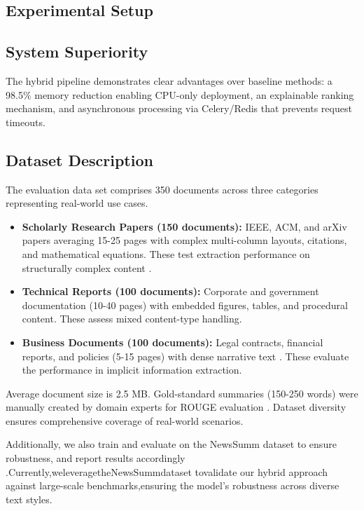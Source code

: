 \documentclass[conference]{IEEEtran}
\begin{document}
\begin{itemize}

\section{Experimental Setup}

\subsection{System Superiority}
The hybrid pipeline demonstrates clear advantages over baseline methods: a 98.5\% memory reduction enabling CPU-only deployment, an explainable ranking mechanism, and asynchronous processing via Celery/Redis that prevents request timeouts.


\subsection{Dataset Description}
The evaluation data set comprises 350 documents across three categories representing real-world use cases.

\begin{itemize}
    \item \textbf{Scholarly Research Papers (150 documents):} IEEE, ACM, and arXiv papers averaging 15-25 pages with complex multi-column layouts, citations, and mathematical equations. These test extraction performance on structurally complex content \cite{10}.
    \item \textbf{Technical Reports (100 documents):} Corporate and government documentation (10-40 pages) with embedded figures, tables, and procedural content. These assess mixed content-type handling.
    \item \textbf{Business Documents (100 documents):} Legal contracts, financial reports, and policies (5-15 pages) with dense narrative text \cite{6}. These evaluate the performance in implicit information extraction.
\end{itemize}

Average document size is 2.5 MB. Gold-standard summaries (150-250 words) were manually created by domain experts for ROUGE evaluation \cite{19}. Dataset diversity ensures comprehensive coverage of real-world scenarios.

Additionally, we also train and evaluate on the NewsSumm dataset to ensure robustness, and report results accordingly \cite{25}.Currently,weleveragetheNewsSummdataset tovalidate
our hybrid approach against large-scale benchmarks,ensuring the model’s robustness across diverse text styles.


\end{itemize}
\end{document}
